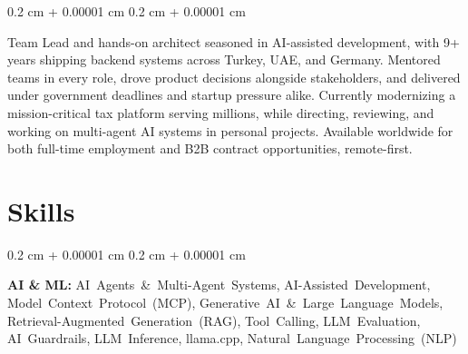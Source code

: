 \documentclass[10pt, letterpaper]{article}
\newenvironment{onecolentry}{
    \begin{adjustwidth}{
        0.2 cm + 0.00001 cm
    }{
        0.2 cm + 0.00001 cm
    }
}{
    \end{adjustwidth}
} %
\begin{document}
        \begin{onecolentry}

            Team Lead and hands-on architect seasoned in AI-assisted development, with 9+ years shipping backend systems across Turkey, UAE, and Germany. Mentored teams in every role, drove product decisions alongside stakeholders, and delivered under government deadlines and startup pressure alike. Currently modernizing a mission-critical tax platform serving millions, while directing, reviewing, and working on multi-agent AI systems in personal projects. Available worldwide for both full-time employment and B2B \mbox{contract} opportunities, remote-first.


        \end{onecolentry}
    
    \section{Skills}




        \begin{onecolentry}
            {\raggedright\textbf{AI \& ML:} \mbox{AI Agents \& Multi-Agent Systems}, \mbox{AI-Assisted Development}, \mbox{Model Context Protocol (MCP)}, \mbox{Generative AI \& Large Language Models}, \mbox{Retrieval-Augmented Generation (RAG)}, \mbox{Tool Calling}, \mbox{LLM Evaluation}, \mbox{AI Guardrails}, \mbox{LLM Inference}, \mbox{llama.cpp}, \mbox{Natural Language Processing (NLP)}\par}
        \end{onecolentry}
\end{document}
